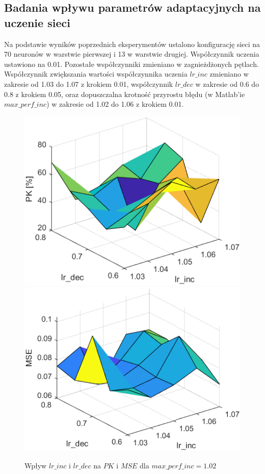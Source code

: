 \subsection{Badania wpływu parametrów adaptacyjnych na uczenie sieci}
Na podstawie wyników poprzednich eksperymentów ustalono konfigurację sieci na 70 neuronów w warstwie pierwszej i 13 w warstwie drugiej. Współczynnik uczenia ustawiono na 0.01. Pozostałe współczynniki zmieniano w zagnieżdżonych pętlach. Współczynnik zwiększania wartości współczynnika uczenia $lr\_inc$ zmieniano w zakresie od 1.03 do 1.07 z krokiem 0.01, współczynnik $lr\_dec$ w zakresie od 0.6 do 0.8 z krokiem 0.05, oraz dopuszczalna krotność przyrostu błędu (w Matlab'ie $max\_perf\_inc$) w zakresie od 1.02 do 1.06 z krokiem 0.01.

\begin{figure}[!htb]
  \includegraphics[width = \linewidth]{Grafika/exp5/pk102.png}
\endminipage\hfill
{}
  \includegraphics[width = \linewidth]{Grafika/exp5/mse102.png}
\endminipage\hfill
\caption{Wpływ $lr\_inc$ i $lr\_dec$ na $PK$ i $MSE$ dla $max\_perf\_inc=1.02$}
\end{figure}
